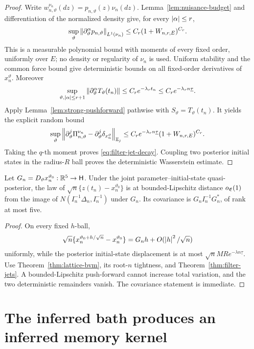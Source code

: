 \begin{proof}
Write
\(w_{n,\vartheta}^{\nu_n}(dz)=p_{n,\vartheta}(z)\nu_n(dz)\).
Lemma~\ref{lem:nuisance-budget} and differentiation of the normalized density
give, for every \(\left|\alpha\right|\le r\),
\[
 \sup_{\vartheta}
 \left\|\partial_\vartheta^\alpha p_{n,\vartheta}\right\|_{L^1(\nu_n)}
 \le C_r(1+W_{n,r,E})^{C_r}.
\]
This is a measurable polynomial bound with moments of every fixed order,
uniformly over \(E\); no density or regularity of \(\nu_n\) is used.
Uniform stability and the common force bound give deterministic bounds on all
fixed-order derivatives of \(x_n^\vartheta\).  Moreover
\[
 \sup_{\vartheta,\left|\alpha\right|\le r+1}
 \left\|\partial_\vartheta^\alpha T_\vartheta(t_n)\right\|
 \le C_re^{-\lambda_rt_n}
 \le C_re^{-\lambda_rn\underline\tau}.
\]
Apply Lemma~\ref{lem:strong-pushforward} pathwise with
\(S_\vartheta=T_\vartheta(t_n)\).  It yields the explicit random bound
\[
 \sup_{\vartheta}
 \left\|\partial_\vartheta^j\Pi_{n,\vartheta}^{\nu_n}
       -\partial_\vartheta^j\delta_{x_n^\vartheta}\right\|_{\mathbb E_j}
 \le C_re^{-\lambda_rn\underline\tau}
       (1+W_{n,r,E})^{C_r}.
\]
Taking the \(q\)-th moment proves \eqref{eq:filter-jet-decay}.  Coupling two
posterior initial states in the radius-\(R\) ball proves the deterministic
Wasserstein estimate.
\end{proof}

\begin{corollary}
\label{cor:state-image}
Let \(G_n=D_\vartheta x_n^{\vartheta_0}:\mathbb R^5\to\mathsf H\).  Under the joint
parameter--initial-state quasi-posterior, the law of
\(\sqrt n\{z(t_n)-x_n^{\vartheta_0}\}\) is at bounded-Lipschitz distance
\(o_{\mathfrak E}(1)\) from the image of
\(N(I_n^{-1}\Delta_n,I_n^{-1})\) under \(G_n\).  Its covariance is
\(G_nI_n^{-1}G_n^*\), of rank at most five.
\end{corollary}

\begin{proof}
On every fixed \(h\)-ball,
\[
 \sqrt n\{x_n^{\vartheta_0+h/\sqrt n}-x_n^{\vartheta_0}\}
 =G_nh+O(\left|h\right|^2/\sqrt n)
\]
uniformly, while the posterior initial-state displacement is at most
\(\sqrt nMRe^{-\lambda n\underline\tau}\).  Use Theorem~\ref{thm:lattice-bvm}, its
root-\(n\) tightness, and Theorem~\ref{thm:filter-jets}.  A bounded-Lipschitz
push-forward cannot increase total variation, and the two deterministic
remainders vanish.  The covariance statement is immediate.
\end{proof}

\section{The inferred bath produces an inferred memory kernel}
\label{sec:memory}

